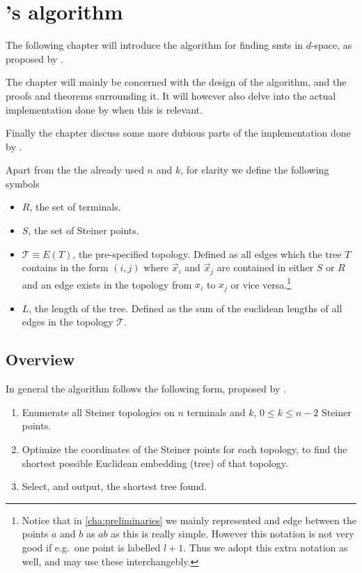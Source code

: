 { \abnormalparskip{0pt}
\chapter{\citeauthor{smith1992}'s algorithm}
\label{cha:algorithm} }


The following chapter will introduce the algorithm for finding \acp{smt} in
$d$-space, as proposed by \textcite{smith1992}.

The chapter will mainly be concerned with the design of the algorithm, and the
proofs and theorems surrounding it. It will however also delve into the actual
implementation done by \citeauthor{smith1992} when this is relevant.

Finally the chapter discuss some more dubious parts of the implementation done
by \citeauthor{smith1992}.

Apart from the the already used $n$ and $k$, for clarity we define the following symbols
%
\begin{itemize}
\item $R$, the set of terminals.
\item $S$, the set of Steiner points.
\item $\mathcal{T} \equiv E(T)$, the pre-specified topology. Defined as all
  edges which the tree $T$ contains in the form $(i, j)$ where $\vec x_i$ and
  $\vec x_j$ are contained in either $S$ or $R$ and an edge exists in the
  topology from $x_i$ to $x_j$ or vice versa.\footnote{Notice that in
    \cref{cha:preliminaries} we mainly represented and edge between the points
    $a$ and $b$ as $ab$ as this is really simple. However this notation is not
    very good if e.g.\ one point is labelled $l+1$. Thus we adopt this extra
    notation as well, and may use these interchangebly.}
\item $L$, the length of the tree. Defined as the sum of the euclidean lengths
of all edges in the topology $\mathcal{T}$.
\end{itemize}

\section{Overview}
\label{sec:overview}

In general the algorithm follows the following form, proposed by \textcite{gilbert1968}.

\begin{enumerate}
\item Enumerate all Steiner topologies on $n$ terminals and $k$, $0 \le k \le
n-2$ Steiner points.
\item Optimize the coordinates of the Steiner points for each topology, to find
the shortest possible Euclidean embedding (tree) of that topology.
\item Select, and output, the shortest tree found.
\end{enumerate}

